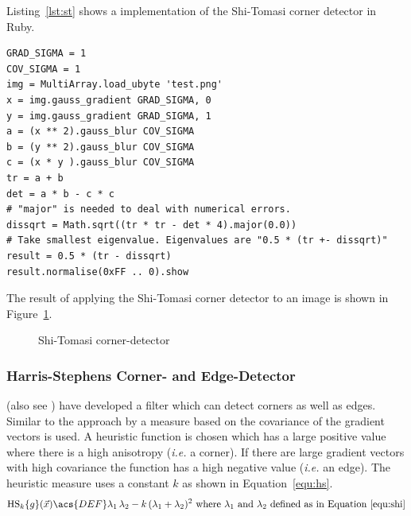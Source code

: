 \documentclass[12pt,a4paper,oneside,openright]{book}
\newcommand{\ie}{\emph{i.e.} }
\newcommand{\equ}[1]{Equation~\ref{equ:#1}}
\newcommand{\fig}[1]{Figure~\ref{fig:#1}}
\newcommand{\lst}[1]{Listing~\ref{lst:#1}}
\begin{document}
\begin{CJK}{UTF8}{}
\lst{st} shows a implementation of the Shi-Tomasi corner detector in Ruby.
\lstset{language=Ruby,frame=single,numbers=none}
\begin{lstlisting}[float,caption={Shi-Tomasi corner detector},escapechar=\$,label=lst:st]
GRAD_SIGMA = 1
COV_SIGMA = 1
img = MultiArray.load_ubyte 'test.png'
x = img.gauss_gradient GRAD_SIGMA, 0
y = img.gauss_gradient GRAD_SIGMA, 1
a = (x ** 2).gauss_blur COV_SIGMA
b = (y ** 2).gauss_blur COV_SIGMA
c = (x * y ).gauss_blur COV_SIGMA
tr = a + b
det = a * b - c * c
# "major" is needed to deal with numerical errors.
dissqrt = Math.sqrt((tr * tr - det * 4).major(0.0))
# Take smallest eigenvalue. Eigenvalues are "0.5 * (tr +- dissqrt)"
result = 0.5 * (tr - dissqrt)
result.normalise(0xFF .. 0).show
\end{lstlisting}
The result of applying the Shi-Tomasi corner detector to an image is shown in \fig{klt}.
\begin{figure}[htbp]
   \begin{center}
     \begin{minipage}[c]{.45\textwidth}
     \end{minipage}
     \begin{minipage}[c]{.45\textwidth}
       \resizebox{\textwidth}{!}{\texttt{[image: s\_t]}}
     \end{minipage}
     \caption{Shi-Tomasi corner-detector\label{fig:klt}}
   \end{center}
\end{figure}

\subsubsection{Harris-Stephens Corner- and Edge-Detector}\label{cha:hs}
\citealp{RefWorks:348} (also see \citet{RefWorks:349}) have developed a filter which can detect corners as well as edges. Similar to the approach by \citeauthor*{RefWorks:355} a measure based on the covariance of the gradient vectors is used. A heuristic function is chosen which has a large positive value where there is a high anisotropy (\ie a corner). If there are large gradient vectors with high covariance the function has a high negative value (\ie an edge). The heuristic measure uses a constant $k$ as shown in \equ{hs}.
\begin{equation}\label{equ:hs}
  \operatorname{HS}_k\{g\}(\vec{x})\acs{DEF}\lambda_1\,\lambda_2-k\,(\lambda_1+\lambda_2)^2\mathrm{\ where\ }\lambda_1\mathrm{\ and\ }\lambda_2\mathrm{\ defined\ as\ in\ \equ{shi}}
\end{equation}


\end{CJK}
\end{document}
